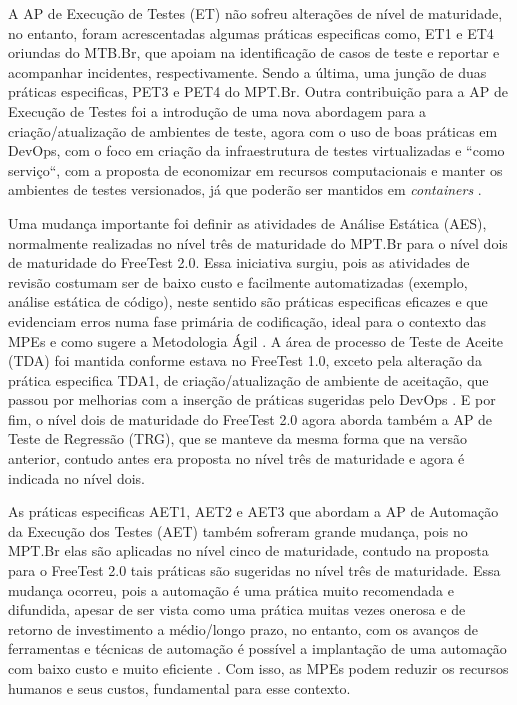A AP de Execução de Testes (ET) não sofreu alterações de nível de maturidade, no entanto, foram acrescentadas algumas práticas especificas como, ET1 e ET4 oriundas do MTB.Br, que apoiam na identificação de casos de teste e reportar e acompanhar incidentes, respectivamente. Sendo a última, uma junção de duas práticas especificas, PET3 e PET4 do MPT.Br. Outra contribuição para a AP de Execução de Testes foi a introdução de uma nova abordagem para a criação/atualização de ambientes de teste, agora com o uso de boas práticas em DevOps, com o foco em criação da infraestrutura de testes virtualizadas e “como serviço“, com a proposta de economizar em recursos computacionais e manter os ambientes de testes versionados, já que poderão ser mantidos em \textit{containers} \cite{BRAGA2015}.

Uma mudança importante foi definir as atividades de Análise Estática (AES), normalmente realizadas no nível três de maturidade do MPT.Br para o nível dois de maturidade do FreeTest 2.0. Essa iniciativa surgiu, pois as atividades de revisão costumam ser de baixo custo e facilmente automatizadas (exemplo, análise estática de código), neste sentido são práticas especificas eficazes e que evidenciam erros numa fase primária de codificação, ideal para o contexto das MPEs e como sugere a Metodologia Ágil \cite{Beck2001}. A área de processo de Teste de Aceite (TDA) foi mantida conforme estava no FreeTest 1.0, exceto pela alteração da prática especifica TDA1, de criação/atualização de ambiente de aceitação, que passou por melhorias com a inserção de práticas sugeridas pelo DevOps \cite{Howlett}. E por fim, o nível dois de maturidade do FreeTest 2.0 agora aborda também a AP de Teste de Regressão (TRG), que se manteve da mesma forma que na versão anterior, contudo antes era proposta no nível três de maturidade e agora é indicada no nível dois.

As práticas especificas AET1, AET2 e AET3 que abordam a AP de Automação da Execução dos Testes (AET) também sofreram grande mudança, pois no MPT.Br elas são aplicadas no nível cinco de maturidade, contudo na proposta para o FreeTest 2.0 tais práticas são sugeridas no nível três de maturidade. Essa mudança ocorreu, pois a automação é uma prática muito recomendada e difundida, apesar de ser vista como uma prática muitas vezes onerosa e de retorno de investimento a médio/longo prazo, no entanto, com os avanços de ferramentas e técnicas de automação é possível a implantação de uma automação com baixo custo e muito eficiente \cite{humble2010}. Com isso, as MPEs podem reduzir os recursos humanos e seus custos, fundamental para esse contexto. 

